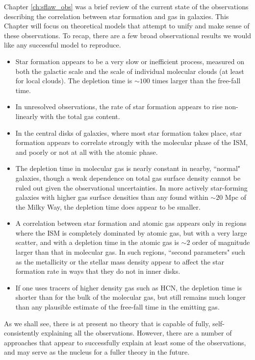 Chapter \ref{ch:sflaw_obs} was a brief review of the current state of the observations describing the correlation between star formation and gas in galaxies. This Chapter will focus on theoretical models that attempt to unify and make sense of these observations. To recap, there are a few broad observational results we would like any successful model to reproduce.
\begin{itemize}
\item Star formation appears to be a very slow or inefficient process, measured on both the galactic scale and the scale of individual molecular clouds (at least for local clouds). The depletion time is $\sim 100$ times larger than the free-fall time.
\item In unresolved observations, the rate of star formation appears to rise non-linearly with the total gas content.
\item In the central disks of galaxies, where most star formation takes place, star formation appears to correlate strongly with the molecular phase of the ISM, and poorly or not at all with the atomic phase.
\item The depletion time in molecular gas is nearly constant in nearby, ``normal" galaxies, though a weak dependence on total gas surface density cannot be ruled out given the observational uncertainties. In more actively star-forming galaxies with higher gas surface densities than any found within $\sim 20$ Mpc of the Milky Way, the depletion time does appear to be smaller.
\item  A correlation between star formation and atomic gas appears only in regions where the ISM is completely dominated by atomic gas, but with a very large scatter, and with a depletion time in the atomic gas is $\sim 2$ order of magnitude larger than that in molecular gas. In such regions, ``second parameters" such as the metallicity or the stellar mass density appear to affect the star formation rate in ways that they do not in inner disks.
\item If one uses tracers of higher density gas such as HCN, the depletion time is shorter than for the bulk of the molecular gas, but still remains much longer than any plausible estimate of the free-fall time in the emitting gas.
\end{itemize}
As we shall see, there is at present no theory that is capable of fully, self-consistently explaining all the observations. However, there are a number of approaches that appear to successfully explain at least some of the observations, and may serve as the nucleus for a fuller theory in the future.

